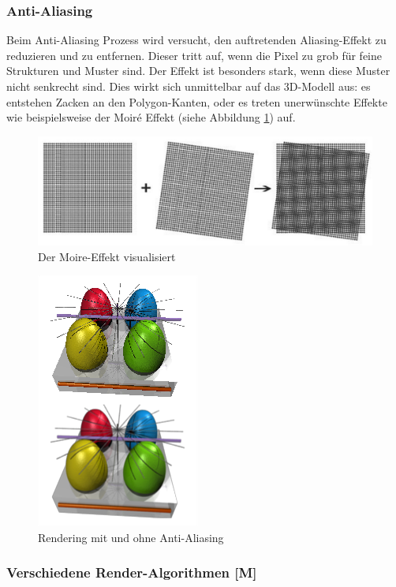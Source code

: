 \subsubsection{Anti-Aliasing}
Beim Anti-Aliasing Prozess wird versucht, den auftretenden Aliasing-Effekt zu reduzieren und zu entfernen. Dieser tritt auf, wenn die Pixel zu grob für feine Strukturen und Muster sind. Der Effekt ist besonders stark, wenn diese Muster nicht senkrecht sind. Dies wirkt sich unmittelbar auf das 3D-Modell aus: es entstehen Zacken an den Polygon-Kanten, oder es treten unerwünschte Effekte wie beispielsweise der Moiré Effekt (siehe Abbildung \ref{fig:impl:MoireEffekt}) auf. 
\cite{Rendering3DModels} 
\begin{figure}
    \centering
    \includegraphics[scale=0.3]{pics/moire-effekt.jpg}
    \caption{Der Moire-Effekt visualisiert \cite{MoireEffekt}}
    \label{fig:impl:MoireEffekt}
\end{figure}

\begin{figure}
    \centering
    \includegraphics[scale=0.7]{pics/anti-aliasing.png}
    \caption{Rendering mit und ohne Anti-Aliasing \cite{AntiAliasing}}
    \label{fig:impl:anti-aliasing}
\end{figure}

\subsubsection{Verschiedene Render-Algorithmen [M]}
